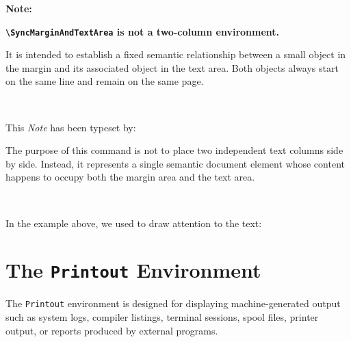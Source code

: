 \documentclass[
11pt,
a4paper,
oneside
]{scrbook}
\begin{document}
\begin{SynchronizedMarginAndTextArea}
\begin{TextInMarginArea}
%
	\textbf{Note:}

\end{TextInMarginArea}
\begin{TextInTextArea}
%
	\textbf{\texttt{\textbackslash SyncMarginAndTextArea} is not a
		two-column environment.}
	
	It is intended to establish a fixed semantic relationship between a
	small object in the margin and its associated object in the text
	area. Both objects always start on the same line and remain on the
	same page.

\end{TextInTextArea}
\end{SynchronizedMarginAndTextArea}

\ %

\noindent This \emph{Note} has been typeset by:





 
\begin{SynchronizedMarginAndTextArea}
\begin{TextInMarginArea}
\end{TextInMarginArea}
\begin{TextInTextArea}
%
	The purpose of this command is not to place two independent 
	text columns side by side. Instead, it represents a single 
	semantic document element whose content happens to occupy 
	both the margin area and the text area.

\end{TextInTextArea}
\end{SynchronizedMarginAndTextArea}
\ %

\noindent In the example above, we used  to draw attention to the text:




 
\chapter{The \texttt{Printout} Environment}
\begin{center}
\end{center}
The \texttt{Printout} environment is designed for displaying
machine-generated output such as system logs, compiler listings,
terminal sessions, spool files, printer output, or reports produced by
external programs.
\end{document}
